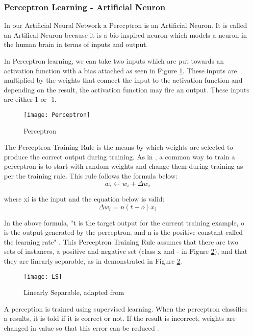 \subsubsection*{Perceptron Learning - Artificial Neuron}
In our Artificial Neural Network a Perecptron is an Artificial Neuron.
It is called an Artifical Neuron because it is a bio-inspired neuron which models
a neuron in the human brain in terms of inputs and output.

In Perceptron learning, we can take two inputs which are put towards an
activation function with a bias attached as seen in Figure \ref{fig:perceptron}.
These inputs are multiplied by the weights that connect the input to the
activation function and depending on the result, the activation function may
fire an output. These inputs are either 1 or -1.

\begin{figure}[h]
     \texttt{[image: Perceptron]}
     \caption{Perceptron}
     \label{fig:perceptron}
\end{figure}

The Perceptron Training Rule is the means by which weights are selected to produce the correct output during training.
As in \parencite{MLANN}, a common way to train a perceptron is to start with random weights and change them during training as per the training rule.
This rule follows the formula below:
\[w_{i} \leftarrow w_{i} + \Delta w_{i}\]

where xi is the input and the equation below is valid:
\[\Delta w_{i} = n(t-o)x_{i}\]

In the above formula, "t is the target output for the current training example, o is the output generated by the perceptron, and n is the positive constant called the learning rate" \parencite{MLANN}.
This Perceptron Training Rule assumes that there are two sets of instances, a
positive and negative set (class x and - in Figure \ref{fig:ls}), and that they are linearly separable, as in demonstrated in Figure \ref{fig:ls}. 

\begin{figure}[h]
    \texttt{[image: LS]}
     \caption{Linearly Separable, adapted from \parencite{MLANN}}
     \label{fig:ls}
\end{figure}

A perception is trained using supervised learning. When the perceptron
classifies a results, it is told if it is correct or not. If the result is
incorrect, weights are changed in value so that this error can be reduced
\parencite{AI}. 

